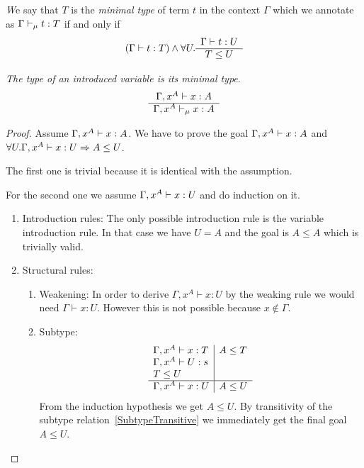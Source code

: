 \begin{definition}
    \emph We say that $T$ is the \emph{minimal type} of term $t$ in the
    context $\Gamma$ which we annotate as $\Gamma \vdash_\mu t: T$ if and only
    if
    $$
    (\Gamma \vdash t: T)
    \land
    \forall U. \begin{array}{c} \Gamma \vdash t: U \\ \hline T \le U\end{array}
    $$
\end{definition}


\begin{lemma}
    \label{MinimalTypeOfVariable}
    \emph{The type of an introduced variable is its minimal type}.
    $$
    \begin{array}{c} 
        \Gamma,x^A \vdash x: A
     \\ \hline 
        \Gamma, x^A \vdash_\mu x: A
    \end{array}
    $$

    \begin{proof}
        Assume $\Gamma, x^A \vdash x: A$. We have to prove the goal
        $\Gamma, x^A \vdash x: A$ and
        $\forall U. \Gamma, x^A \vdash x: U \Rightarrow A \le U$.

        The first one is trivial because it is identical with the assumption.

        For the second one we assume $\Gamma, x^A \vdash x: U$ and do
        induction on it.
        \begin{enumerate}
            \item Introduction rules: The only possible introduction rule is the
                variable introduction rule. In that case we have $U = A$ and the
                goal is $A \le A$ which is trivially valid.

            \item Structural rules:
            \begin{enumerate}
                \item Weakening: In order to derive $\Gamma,x^A \vdash x: U$ by
                    the weaking rule we would need $\Gamma \vdash x : U$.
                    However this is not possible because $x \notin \Gamma$.

                \item Subtype:
                $$
                \begin{array}{l|l}
                    \Gamma, x^A \vdash x: T
                    &
                    A \le T
                    \\
                    \Gamma, x^A \vdash U: s
                    \\
                    T \le U
                    \\
                    \hline
                    \Gamma, x^A \vdash x: U
                    &
                    A \le U
                \end{array}
                $$
                From the induction hypothesis we get $A \le U$. By transitivity
                    of the subtype relation~\ref{SubtypeTransitive} we
                    immediately get the final goal $A \le U$.
            \end{enumerate}
        \end{enumerate}
    \end{proof}
\end{lemma}




